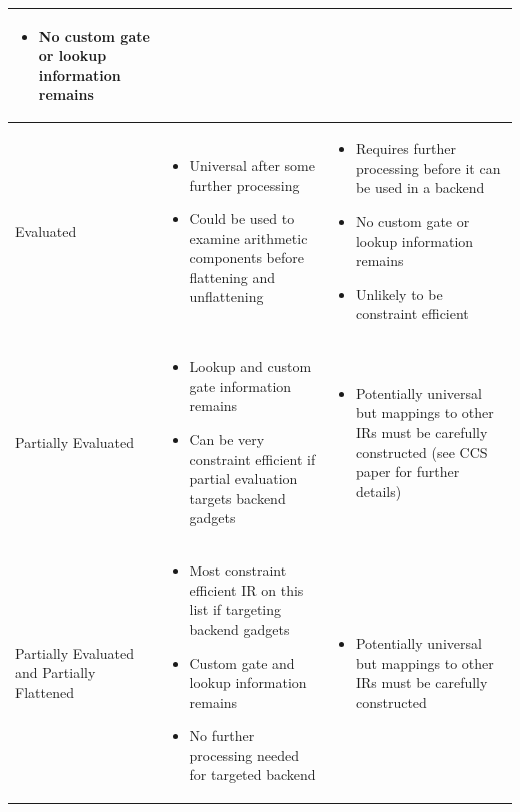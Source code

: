 \documentclass[
    9pt,            %
    techreport,        %
    affiltop,       %
]{art}
\begin{document}
\begin{tabular}{p{3cm}|p{5cm}|p{5cm}}
\begin{itemize}
        \item No custom gate or lookup information remains
    \end{itemize}
    \\
    \hline
     \vfill Evaluated &
     \begin{itemize} \setlength{\itemindent}{-1.5em}
         \item Universal after some further processing
         \item Could be used to examine arithmetic components before flattening and unflattening
     \end{itemize} & 
     \begin{itemize} \setlength{\itemindent}{-1.5em}
         \item Requires further processing before it can be used in a backend
         \item No custom gate or lookup information remains
         \item Unlikely to be constraint efficient
     \end{itemize}     
     \\
     \hline
     \vfill Partially Evaluated &
     \begin{itemize} \setlength{\itemindent}{-1.5em}
         \item Lookup and custom gate information remains
         \item Can be very constraint efficient if partial evaluation targets backend gadgets
     \end{itemize} & 
     \begin{itemize} \setlength{\itemindent}{-1.5em}
         \item Potentially universal but mappings to other IRs must be carefully constructed (see CCS paper \cite{cryptoeprint:2023/552} for further details)
     \end{itemize} 
     \\
     \hline
     \vfill Partially Evaluated and Partially Flattened &
     \begin{itemize} \setlength{\itemindent}{-1.5em}
         \item Most constraint efficient IR on this list if targeting backend gadgets
         \item Custom gate and lookup information remains
         \item No further processing needed for targeted backend
     \end{itemize} & 
     \begin{itemize} \setlength{\itemindent}{-1.5em}
         \item Potentially universal but mappings to other IRs must be carefully constructed 
     \end{itemize}
     \\ 
     \hline
\end{tabular}
\end{document}
